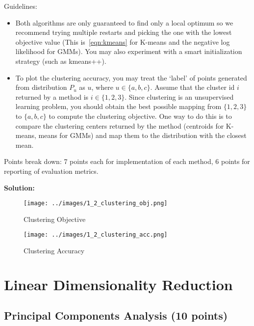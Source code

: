 \documentclass[a4paper]{article}
\newcounter{thm}
\theoremstyle{definition}
\begin{document}
Guidelines:
\begin{itemize} 
\item Both algorithms are only guaranteed to find only a local optimum so we recommend trying multiple
restarts and picking the one with the lowest objective value (This is~\eqref{eqn:kmeans} for K-means and the negative log likelihood for GMMs).
You may also experiment with a smart initialization
strategy (such as kmeans++).

\item
To plot the clustering accuracy,  you may treat the `label' of points generated from distribution
$P_u$ as $u$, where $u\in \{a, b, c\}$.
Assume that the cluster id $i$ returned by a method is $i\in \{1, 2, 3\}$.
Since clustering is an unsupervised learning problem, you should obtain the best possible mapping
from $\{1, 2, 3\}$ to $\{a, b, c\}$ to compute the clustering objective.
One way to do this is to compare the clustering centers returned by the method (centroids for
K-means, means for GMMs) and map them to the distribution with the closest mean.

\end{itemize}

Points break down: 7 points each for implementation of each method, 6 points for reporting of
evaluation metrics.

\textbf{Solution: }\\
\begin{figure}[H]
    \centering
    \texttt{[image: ../images/1\_2\_clustering\_obj.png]}
    \caption{Clustering Objective}
    \label{fig:obj}
\end{figure}


\begin{figure}[H]
    \centering
    \texttt{[image: ../images/1\_2\_clustering\_acc.png]}
    \caption{Clustering Accuracy}
    \label{fig:acc}
\end{figure}

\section{Linear Dimensionality Reduction}

\subsection{Principal Components Analysis  (10 points)}
\label{sec:pca}
\end{document}
